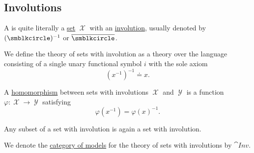 \subsection{Involutions}\label{subsec:involutions}

\begin{definition}\label{def:set_with_involution}
  A  is quite literally a \hyperref[def:set]{set} \( \mscrX \) with an \hyperref[def:multi_valued_function/involution]{involution}, usually denoted by \( (\placeholder)^{-1} \) or \( \overline \placeholder \).

  \begin{thmenum}
     We define the theory of sets with involution as a theory over the language consisting of a single unary functional symbol \( i \) with the sole axiom
    \begin{equation}\label{eq:def:set_with_involution/theory/axiom}
      (x^{-1})^{-1} \doteq x.
    \end{equation}

     A \hyperref[def:first_order_homomorphism]{homomorphism} between sets with involutions \( \mscrX \) and \( \mscrY \) is a function \( \varphi: \mscrX \to \mscrY \) satisfying
    \begin{equation}\label{eq:def:set_with_involution/homomorphism}
      \varphi(x^{-1})
      =
      \varphi(x)^{-1}.
    \end{equation}

     Any subset of a set with involution is again a set with involution.

     We denote the \hyperref[def:category_of_first_order_models]{category of models} for the theory of sets with involutions by \( \cat{Inv} \).
  \end{thmenum}
\end{definition}
